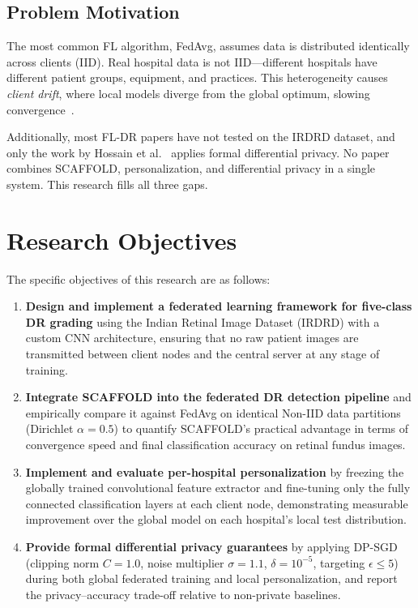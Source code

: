 \documentclass[10pt, conference]{IEEEtran}
\begin{document}
\subsection{Problem Motivation}

The most common FL algorithm, FedAvg, assumes data is distributed identically
across clients (IID). Real hospital data is not IID---different hospitals have
different patient groups, equipment, and practices. This heterogeneity causes
\textit{client drift}, where local models diverge from the global optimum,
slowing convergence~\cite{r5}.

Additionally, most FL-DR papers have not tested on the IRDRD dataset, and only
the work by Hossain et al.~\cite{r12} applies formal differential privacy. No
paper combines SCAFFOLD, personalization, and differential privacy in a single
system. This research fills all three gaps.

\section{Research Objectives}

The specific objectives of this research are as follows:

\begin{enumerate}[leftmargin=*, label=\textbf{O\arabic*.}, itemsep=3pt]

\item \textbf{Design and implement a federated learning framework for five-class
DR grading} using the Indian Retinal Image Dataset (IRDRD) with a custom CNN
architecture, ensuring that no raw patient images are transmitted between client
nodes and the central server at any stage of training.

\item \textbf{Integrate SCAFFOLD into the federated DR detection pipeline} and
empirically compare it against FedAvg on identical Non-IID data partitions
(Dirichlet $\alpha=0.5$) to quantify SCAFFOLD's practical advantage in terms of
convergence speed and final classification accuracy on retinal fundus images.

\item \textbf{Implement and evaluate per-hospital personalization} by freezing
the globally trained convolutional feature extractor and fine-tuning only the
fully connected classification layers at each client node, demonstrating
measurable improvement over the global model on each hospital's local test
distribution.

\item \textbf{Provide formal differential privacy guarantees} by applying DP-SGD
(clipping norm $C=1.0$, noise multiplier $\sigma=1.1$, $\delta=10^{-5}$,
targeting $\epsilon \leq 5$) during both global federated training and local
personalization, and report the privacy--accuracy trade-off relative to
non-private baselines.

\end{enumerate}
\end{document}
